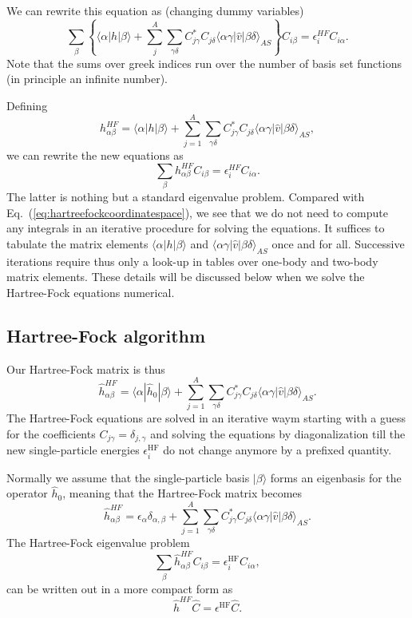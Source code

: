 \documentclass[%
oneside,                 %
final,                   %
10pt]{article}
\begin{document}
We can rewrite this equation as (changing dummy variables)
\[
\sum_{\beta} \left\{\langle \alpha | h | \beta \rangle+
\sum_{j}^A\sum_{\gamma\delta} C^*_{j\gamma}C_{j\delta}\langle \alpha\gamma|\hat{v}|\beta\delta\rangle_{AS}\right\}C_{i\beta}=\epsilon_i^{HF}C_{i\alpha}.
\]
Note that the sums over greek indices run over the number of basis set functions (in principle an infinite number).

Defining 
\[
h_{\alpha\beta}^{HF}=\langle \alpha | h | \beta \rangle+
\sum_{j=1}^A\sum_{\gamma\delta} C^*_{j\gamma}C_{j\delta}\langle \alpha\gamma|\hat{v}|\beta\delta\rangle_{AS},
\]
we can rewrite the new equations as 
\begin{equation}
\sum_{\beta}h_{\alpha\beta}^{HF}C_{i\beta}=\epsilon_i^{HF}C_{i\alpha}. \label{eq:newhf}
\end{equation}
The latter is nothing but a standard eigenvalue problem. Compared with Eq.~(\ref{eq:hartreefockcoordinatespace}),
we see that we do not need to compute any integrals in an iterative procedure for solving the equations.
It suffices to tabulate the matrix elements $\langle \alpha | h | \beta \rangle$ and $\langle \alpha\gamma|\hat{v}|\beta\delta\rangle_{AS}$ once and for all. Successive iterations require thus only a look-up in tables over one-body and two-body matrix elements. These details will be discussed below when we solve the Hartree-Fock equations numerical. 

\subsection*{Hartree-Fock algorithm}

Our Hartree-Fock matrix  is thus
\[
\hat{h}_{\alpha\beta}^{HF}=\langle \alpha | \hat{h}_0 | \beta \rangle+
\sum_{j=1}^A\sum_{\gamma\delta} C^*_{j\gamma}C_{j\delta}\langle \alpha\gamma|\hat{v}|\beta\delta\rangle_{AS}.
\]
The Hartree-Fock equations are solved in an iterative waym starting with a guess for the coefficients $C_{j\gamma}=\delta_{j,\gamma}$ and solving the equations by diagonalization till the new single-particle energies
$\epsilon_i^{\mathrm{HF}}$ do not change anymore by a prefixed quantity. 

Normally we assume that the single-particle basis $|\beta\rangle$ forms an eigenbasis for the operator
$\hat{h}_0$, meaning that the Hartree-Fock matrix becomes  
\[
\hat{h}_{\alpha\beta}^{HF}=\epsilon_{\alpha}\delta_{\alpha,\beta}+
\sum_{j=1}^A\sum_{\gamma\delta} C^*_{j\gamma}C_{j\delta}\langle \alpha\gamma|\hat{v}|\beta\delta\rangle_{AS}.
\]
The Hartree-Fock eigenvalue problem
\[
\sum_{\beta}\hat{h}_{\alpha\beta}^{HF}C_{i\beta}=\epsilon_i^{\mathrm{HF}}C_{i\alpha},
\]
can be written out in a more compact form as
\[
\hat{h}^{HF}\hat{C}=\epsilon^{\mathrm{HF}}\hat{C}. 
\]
\end{document}
